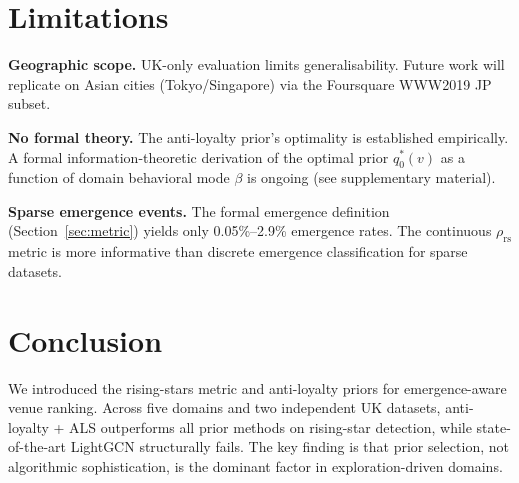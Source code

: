 \documentclass{article}
\begin{document}
\section{Limitations}

\textbf{Geographic scope.}
UK-only evaluation limits generalisability. Future work will replicate
on Asian cities (Tokyo/Singapore) via the Foursquare WWW2019 JP subset.

\textbf{No formal theory.}
The anti-loyalty prior's optimality is established empirically.
A formal information-theoretic derivation of the optimal prior $q_0^*(v)$
as a function of domain behavioral mode $\beta$ is ongoing
(see supplementary material).

\textbf{Sparse emergence events.}
The formal emergence definition (Section~\ref{sec:metric}) yields
only 0.05\%--2.9\% emergence rates.
The continuous $\rho_{\text{rs}}$ metric is more informative than
discrete emergence classification for sparse datasets.

\section{Conclusion}

We introduced the rising-stars metric and anti-loyalty priors for
emergence-aware venue ranking. Across five domains and two independent
UK datasets, anti-loyalty + ALS outperforms all prior methods on
rising-star detection, while state-of-the-art LightGCN structurally fails.
The key finding is that prior selection, not algorithmic sophistication,
is the dominant factor in exploration-driven domains.



\end{document}
